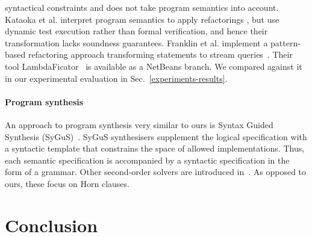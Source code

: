 \documentclass[runningheads,a4paper]{llncs}
\begin{document}
syntactical constraints and does not take program semantics into
account.
%
%
Kataoka et al. interpret program semantics to apply refactorings
\cite{Kataoka:2001:ASP:846228.848644}, but use dynamic test execution
rather than formal verification, and hence their transformation lacks
soundness guarantees.
%
Franklin et al. implement a pattern-based refactoring approach
transforming statements to stream queries~\cite{Gyori:2013:CGI:2491411.2491461}.
Their tool LambdaFicator~\cite{DBLP:conf/icse/FranklinGLD04} is available as a
NetBeans branch. We compared \tool against it in our experimental evaluation
in Sec.~\ref{experiments-results}.
%
%

\paragraph{Program synthesis}

An approach to program synthesis very similar to ours is Syntax Guided
Synthesis (SyGuS)~\cite{sygus}.  SyGuS synthesisers supplement the logical
specification with a syntactic template that constrains the space of allowed
implementations.  Thus, each semantic specification is accompanied by a
syntactic specification in the form of a grammar.  Other second-order
solvers are introduced in~\cite{DBLP:conf/pldi/GrebenshchikovLPR12,
DBLP:conf/cav/BeyenePR13}.  As opposed to ours, these focus on
Horn clauses.

\section{Conclusion}
\end{document}
